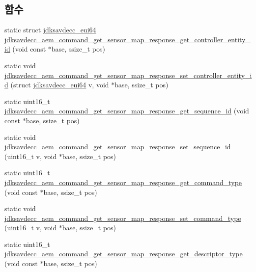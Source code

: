 \subsection*{함수}
\begin{DoxyCompactItemize}
\item 
static struct \hyperlink{structjdksavdecc__eui64}{jdksavdecc\+\_\+eui64} \hyperlink{group__command__get__sensor__map__response_gaf00b5985c963a5cbbd58151c15bb0aac}{jdksavdecc\+\_\+aem\+\_\+command\+\_\+get\+\_\+sensor\+\_\+map\+\_\+response\+\_\+get\+\_\+controller\+\_\+entity\+\_\+id} (void const $\ast$base, ssize\+\_\+t pos)
\item 
static void \hyperlink{group__command__get__sensor__map__response_ga43d13395fdb75cf4eb83c108aa1b2bbc}{jdksavdecc\+\_\+aem\+\_\+command\+\_\+get\+\_\+sensor\+\_\+map\+\_\+response\+\_\+set\+\_\+controller\+\_\+entity\+\_\+id} (struct \hyperlink{structjdksavdecc__eui64}{jdksavdecc\+\_\+eui64} v, void $\ast$base, ssize\+\_\+t pos)
\item 
static uint16\+\_\+t \hyperlink{group__command__get__sensor__map__response_gaf482133c665a0098995e8315c444053d}{jdksavdecc\+\_\+aem\+\_\+command\+\_\+get\+\_\+sensor\+\_\+map\+\_\+response\+\_\+get\+\_\+sequence\+\_\+id} (void const $\ast$base, ssize\+\_\+t pos)
\item 
static void \hyperlink{group__command__get__sensor__map__response_ga9387839f730f8ac3f6e9e63be053fdca}{jdksavdecc\+\_\+aem\+\_\+command\+\_\+get\+\_\+sensor\+\_\+map\+\_\+response\+\_\+set\+\_\+sequence\+\_\+id} (uint16\+\_\+t v, void $\ast$base, ssize\+\_\+t pos)
\item 
static uint16\+\_\+t \hyperlink{group__command__get__sensor__map__response_ga8000212e7ec442e7e8cd92ddf62f3845}{jdksavdecc\+\_\+aem\+\_\+command\+\_\+get\+\_\+sensor\+\_\+map\+\_\+response\+\_\+get\+\_\+command\+\_\+type} (void const $\ast$base, ssize\+\_\+t pos)
\item 
static void \hyperlink{group__command__get__sensor__map__response_gaed066f4b6ac63b6223d909da6258ef98}{jdksavdecc\+\_\+aem\+\_\+command\+\_\+get\+\_\+sensor\+\_\+map\+\_\+response\+\_\+set\+\_\+command\+\_\+type} (uint16\+\_\+t v, void $\ast$base, ssize\+\_\+t pos)
\item 
static uint16\+\_\+t \hyperlink{group__command__get__sensor__map__response_ga31dd1d19c268d1e00c14a6b8b545c0a4}{jdksavdecc\+\_\+aem\+\_\+command\+\_\+get\+\_\+sensor\+\_\+map\+\_\+response\+\_\+get\+\_\+descriptor\+\_\+type} (void const $\ast$base, ssize\+\_\+t pos)
\item 

\end{DoxyCompactItemize}
